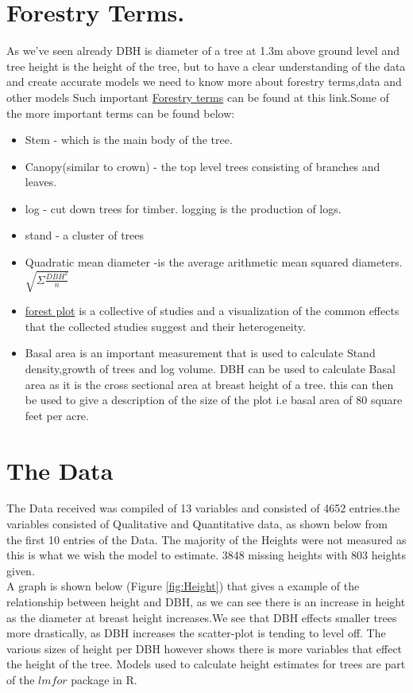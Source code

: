 \documentclass[a4paper,11pt,twoside]{report}
\begin{document}
\section{Forestry Terms.}
As we've seen already DBH is diameter of a tree at 1.3m above ground level and tree height is the height of the tree, but to have a clear understanding of the data and create accurate models we need to know more about forestry terms,data and other models
Such important  \href{http://forestlearning.edu.au/about/forest-terminology-explained.html}{Forestry terms} can be found at this link.Some of the more important terms can be found below:
\begin{itemize}
    \item Stem - which is the main body of the tree.
     \item Canopy(similar to crown) - the top level trees consisting of branches and leaves.
     \item log - cut down trees for timber. logging is the production of logs.
     \item stand - a cluster of trees 
     \item Quadratic mean diameter \cite{curtis2000quadratic} -is the average arithmetic mean squared diameters. 
     $\sqrt{\Sigma\frac{DBH^2}{n}} $
     \item \href{https://www.sciencedirect.com/topics/medicine-and-dentistry/forest-plot}{forest plot} is a collective of studies and a visualization of the common effects that the collected studies suggest and their heterogeneity.
     \item Basal area is an important measurement that is used to calculate Stand density,growth of trees and log volume. DBH can be used to calculate Basal area \cite{elledge2010basal} as it is the cross sectional area at breast height of a tree. this can then be used to give a description of the size of the plot i.e basal area of 80 square feet per acre.
\end{itemize}

\section{The Data}
 The Data received was compiled of 13 variables and consisted of 4652 entries.the variables consisted of Qualitative and Quantitative data, as shown below from the first 10 entries of the Data.
The majority of the Heights were not measured as this is what we wish the model to estimate. 3848 missing heights with 803 heights given.\\
A graph is shown below (Figure \ref{fig:Height}) that gives a example of the relationship between height and DBH, as we can see there is an increase in height as the diameter at breast height increases.We see that DBH effects smaller trees more drastically, as DBH increases the scatter-plot is tending to level off. The various sizes of height per DBH however shows there is more variables that effect the height of the tree.
Models used to calculate height estimates for trees are part of the $lmfor$ package in R.
\end{document}
